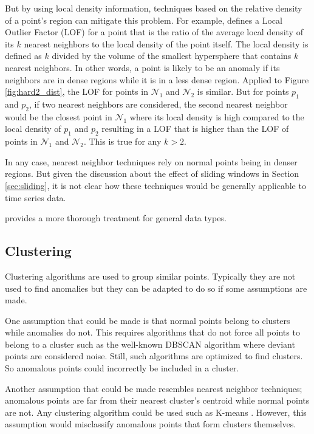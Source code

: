 But by using local density information, techniques based on the relative density of a point's region can mitigate this problem. For example, \cite{Breunig1999} defines a Local Outlier Factor (LOF) for a point that is the ratio of the average local density of its $k$ nearest neighbors to the local density of the point itself. The local density is defined as $k$ divided by the volume of the smallest hypersphere that contains $k$ nearest neighbors. In other words, a point is likely to be an anomaly if its neighbors are in dense regions while it is in a less dense region. Applied to Figure \ref{fig:hard2_dist}, the LOF for points in $\mathcal{N}_1$ and $\mathcal{N}_2$ is similar. But for points $p_1$ and $p_2$, if two nearest neighbors are considered, the second nearest neighbor would be the closest point in $\mathcal{N}_1$ where its local density is high compared to the local density of $p_1$ and $p_2$ resulting in a LOF that is higher than the LOF of points in $\mathcal{N}_1$ and $\mathcal{N}_2$. This is true for any $k>2$.

In any case, nearest neighbor techniques rely on normal points being in denser regions. But given the discussion about the effect of sliding windows in Section \ref{sec:sliding}, it is not clear how these techniques would be generally applicable to time series data.

\cite{Chandola2009} provides a more thorough treatment for general data types.


\subsection{Clustering}

Clustering algorithms are used to group similar points. Typically they are not used to find anomalies but they can be adapted to do so if some assumptions are made.

One assumption that could be made is that normal points belong to clusters while anomalies do not. This requires algorithms that do not force all points to belong to a cluster such as the well-known DBSCAN \cite{Ester1996} algorithm where deviant points are considered noise. Still, such algorithms are optimized to find clusters. So anomalous points could incorrectly be included in a cluster.

Another assumption that could be made resembles nearest neighbor techniques; anomalous points are far from their nearest cluster's centroid while normal points are not. Any clustering algorithm could be used such as K-means \cite{Munz2007}. However, this assumption would misclassify anomalous points that form clusters themselves.

